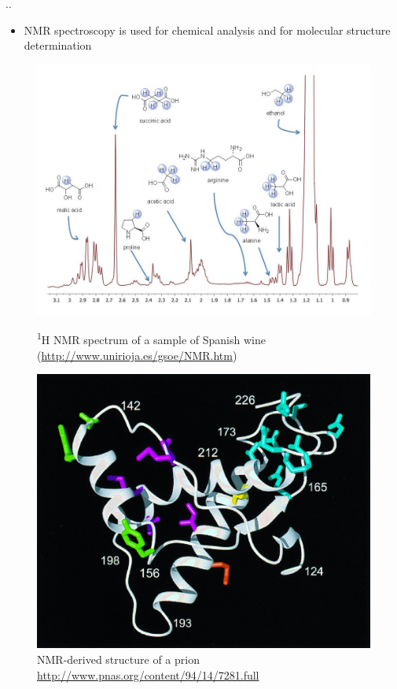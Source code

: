 \documentclass{beamer}
\begin{document}
	\begin{frame}{\thesection.\thesubsection. \insertsubsection}
	
	 \begin{itemize}
	 	\item NMR spectroscopy is used for chemical analysis and for molecular structure determination	  	
	 \end{itemize}
	 
	
		
		\begin{figure}[ht]
			\begin{minipage}[t]{0.45\linewidth}
				\centering
				\includegraphics[width=\textwidth]{wine_spectrum.jpg}
				\caption{\textsuperscript{1}H NMR spectrum of a sample of Spanish wine (\url{http://www.unirioja.es/gsoe/NMR.htm})}
				\label{fig1}
			\end{minipage}
			\hspace{0.3cm}
			\begin{minipage}[t]{0.45\linewidth}
				\centering
				\includegraphics[width=\textwidth]{prion.jpg}
				\caption{NMR-derived structure of a prion  \url{http://www.pnas.org/content/94/14/7281.full}}
				\label{fig3}
			\end{minipage}					
		\end{figure}
	\end{frame}
	
\end{document}
